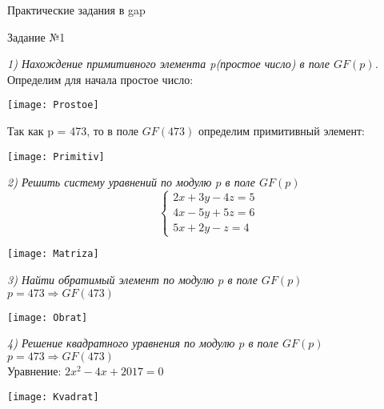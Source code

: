 \begin{title}
  Практические задания в gap
\end{title}

\begin{title}
  Задание №1
\end{title}

\emph{1) Нахождение примитивного элемента p(простое число) в поле $GF(p)$.}\\
Определим для начала простое число:\\

\begin{center}
  \texttt{[image: Prostoe]}
\end{center}

Так как p = 473, то в поле $GF(473)$ определим примитивный элемент:\\

\begin{center}
  \texttt{[image: Primitiv]}
\end{center}

\emph {2) Решить систему уравнений по модулю $p$ в поле $GF(p)$}\\

\begin{equation*}
 \begin{cases}
    2x + 3y - 4z = 5\\
    4x - 5y + 5z = 6\\
    5x + 2y - z = 4
 \end{cases}
\end{equation*}

\begin{center}
  \texttt{[image: Matriza]}
\end{center}

\emph {3) Найти обратимый элемент по модулю $p$ в поле $GF(p)$}\\
$p = 473 \Rightarrow GF(473)$\\

\begin{center}
  \texttt{[image: Obrat]}
\end{center}

\emph {4) Решение квадратного уравнения по модулю $p$ в поле $GF(p)$}\\
$p = 473 \Rightarrow GF(473)$\\
Уравнение: $2x^2 -4x + 2017 = 0$\\

\begin{center}
  \texttt{[image: Kvadrat]}
\end{center}

